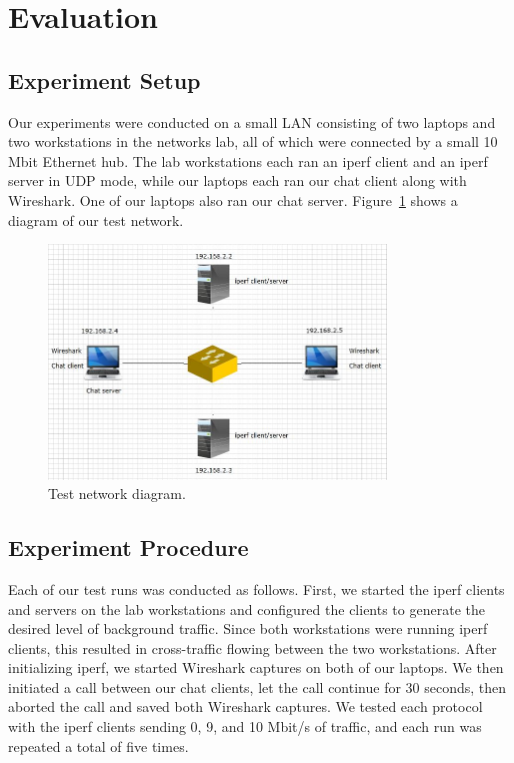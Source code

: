 \documentclass[9pt,twocolumn]{article}
\begin{document}
\section{Evaluation}

\subsection{Experiment Setup}

Our experiments were conducted on a small LAN consisting of two laptops and two
workstations in the networks lab, all of which were connected by a small 10 Mbit
Ethernet hub. The lab workstations each ran an iperf client and an iperf server
in UDP mode, while our laptops each ran our chat client along with Wireshark.
One of our laptops also ran our chat server. Figure~\ref{fig:test_network} shows a
diagram of our test network.

\begin{figure}[!t]
   \centering
      \includegraphics[width=0.8\textwidth]{pics/network_diagram}
   \caption{Test network diagram.}
\label{fig:test_network}
\end{figure}

\subsection{Experiment Procedure}

Each of our test runs was conducted as follows. First, we started the iperf
clients and servers on the lab workstations and configured the clients to
generate the desired level of background traffic. Since both workstations were
running iperf clients, this resulted in cross-traffic flowing between the two
workstations. After initializing iperf, we started Wireshark captures on both of
our laptops. We then initiated a call between our chat clients, let the call
continue for 30 seconds, then aborted the call and saved both Wireshark
captures. We tested each protocol with the iperf clients sending 0, 9, and 10
Mbit/s of traffic, and each run was repeated a total of five times.
\end{document}
